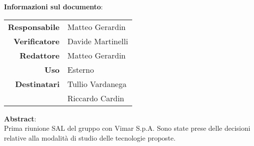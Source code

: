 \begin{center}
\textbf{Informazioni sul documento}: \\
\vspace{0.5cm}

\begin{tabular}{r|l}
    \textbf{Responsabile} &  Matteo Gerardin\\ 
    \textbf{Verificatore} &  Davide Martinelli\\ 
    \textbf{Redattore} &     Matteo Gerardin\\ 
    \textbf{Uso} & Esterno \\ 
    \textbf{Destinatari} & Tullio Vardanega \\ & Riccardo Cardin \\
\end{tabular}

\vfill

\textbf{Abstract}: \\
\vspace{0.5cm}
Prima riunione SAL del gruppo con Vimar S.p.A. Sono state prese delle decisioni relative alla modalità di studio delle tecnologie proposte.
\end{center}


\bigskip